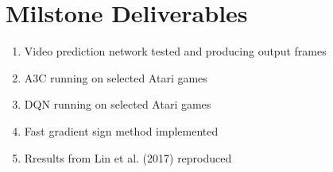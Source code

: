 \section{Milstone Deliverables}

\begin{enumerate}
    \item Video prediction network tested and producing output frames
    \item A3C running on selected Atari games
    \item DQN running on selected Atari games
    \item Fast gradient sign method implemented
    \item Rresults from Lin et al. (2017) reproduced
\end{enumerate}
